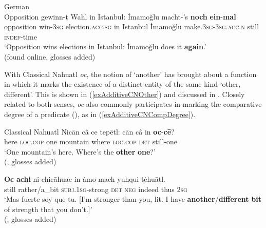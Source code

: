 \begin{exe}
	\ex German\label{exAdditiveIterativeTimes}\\
	\gll Opposition gewinn-t Wahl in Istanbul: İmamoğlu macht-'s \textbf{noch} \textbf{ein}-\textbf{mal}\\
	opposition win-3\textsc{sg} election.\textsc{acc}.\textsc{sg} in Istanbul İmamoğlu make.3\textsc{sg}-3\textsc{sg}.\textsc{acc}.\textsc{n} still \textsc{indef}-time\\
	\glt \lq Opposition wins elections in Istanbul: İmamoğlu does it \textbf{again}.' 
	\\(found online, glosses added)%
\end{exe}

With Classical Nahuatl \textit{oc}, the notion of \lq another\rq{ }has brought about a function in which it marks the existence of a distinct entity of the same kind \lq other, different\rq{}. This is shown in (\ref{exAdditiveCNOther}) and discussed in . Closely related to both senses, \textit{oc} also commonly participates in marking the comparative degree of a predicate (), as in (\ref{exAdditiveCNCompDegree}).

\begin{exe}
	\ex 
	\begin{xlist}
		\exi{}Classical Nahuatl 
		\ex\label{exAdditiveCNOther}	
		\gll Nicān câ ce tepētl: cān câ in \textbf{oc}-\textbf{cē}?\\
		here \textsc{loc}.\textsc{cop} one mountain where \textsc{loc}.\textsc{cop} \textsc{det} still-one\\
		\glt \lq One mountain's here. Where's the \textbf{other} \textbf{one}?'
		\\(\cite[66]{LauneyMackay2011}, glosses added)
	
		\ex\label{exAdditiveCNCompDegree}	
		\gll \textbf{Oc} \textbf{achi} ni-chicāhuac in àmo mach yuhqui tèhuātl. \\
	still rather/a\_bit \textsc{subj}.1\textsc{sg}-strong \textsc{det} \textsc{neg} indeed thus 2\textsc{sg}\\
	\glt \lq Mas fuerte soy que tu. [I'm stronger than you, lit. I have \textbf{another}/\textbf{different} \textbf{bit} of strength that you don't.]\rq{}
	\\(\cite[491]{Carochi1645}, glosses added)
	\end{xlist}
\end{exe}

